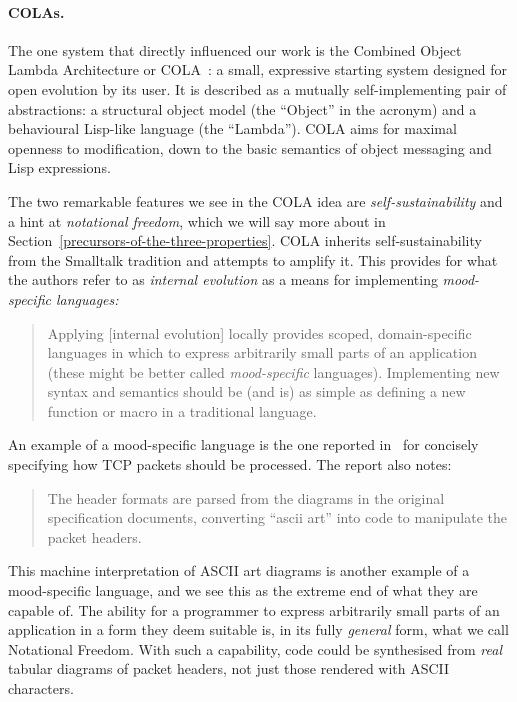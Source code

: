 \paragraph{COLAs.}

The one system that directly influenced our work is the Combined Object
Lambda Architecture or COLA~\cite{COLAs}: a small, expressive starting
system designed for open evolution by its user. It is described as a
mutually self-implementing pair of abstractions: a structural object
model (the ``Object'' in the acronym) and a behavioural Lisp-like
language (the ``Lambda''). COLA aims for maximal openness to
modification, down to the basic semantics of object messaging and Lisp
expressions.

The two remarkable features we see in the COLA idea are
\emph{self-sustainability} and a hint at \emph{notational freedom},
which we will say more about in
Section~\ref{precursors-of-the-three-properties}. COLA inherits
self-sustainability from the Smalltalk tradition and attempts to amplify
it. This provides for what the authors refer to as \emph{internal
evolution} as a means for implementing \emph{mood-specific languages:}

\begin{quote}
Applying {[}internal evolution{]} locally provides scoped,
domain-specific languages in which to express arbitrarily small parts of
an application (these might be better called \emph{mood-specific}
languages). Implementing new syntax and semantics should be (and is) as
simple as defining a new function or macro in a traditional language.
\end{quote}

An example of a mood-specific language is the one reported
in~\cite[p.\ 4]{Steps08} for concisely specifying how TCP packets should
be processed. The report also notes:

\begin{quote}
The header formats are parsed from the diagrams in the original
specification documents, converting ``ascii art'' into code to
manipulate the packet headers.
\end{quote}

This machine interpretation of ASCII art diagrams is another example of
a mood-specific language, and we see this as the extreme end of what
they are capable of. The ability for a programmer to express arbitrarily
small parts of an application in a form they deem suitable is, in its
fully \emph{general} form, what we call Notational Freedom. With such a
capability, code could be synthesised from \emph{real} tabular diagrams
of packet headers, not just those rendered with ASCII characters.

